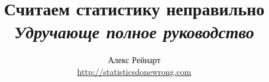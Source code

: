 \documentclass[12pt,a4paper]{report}
\begin{document}

\title{Считаем статистику неправильно\\ \emph{Удручающе полное руководство}}
\author{Алекс Рейнарт\\ \url{http://statisticsdonewrong.com}}
\date{} 
\maketitle

\tableofcontents 













\cleardoublepage
{}
{}
{}





\end{document}
